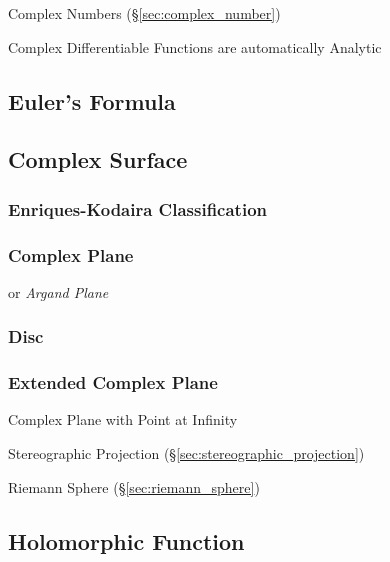 Complex Numbers (\S\ref{sec:complex_number})

Complex Differentiable Functions are automatically Analytic %



\subsection{Euler's Formula}\label{sec:eulers_formula}

\subsection{Complex Surface}\label{sec:complex_surface}

\subsubsection{Enriques-Kodaira Classification}
\label{sec:enriques_kodaira}

\subsubsection{Complex Plane}\label{sec:complex_plane}

or \emph{Argand Plane}



\subsubsection{Disc}\label{sec:disc}\hfill

\subsubsection{Extended Complex Plane}\label{sec:extended_complex_plane}

Complex Plane with Point at Infinity

Stereographic Projection (\S\ref{sec:stereographic_projection})

Riemann Sphere (\S\ref{sec:riemann_sphere})



\subsection{Holomorphic Function}\label{sec:holomorphic_function}

